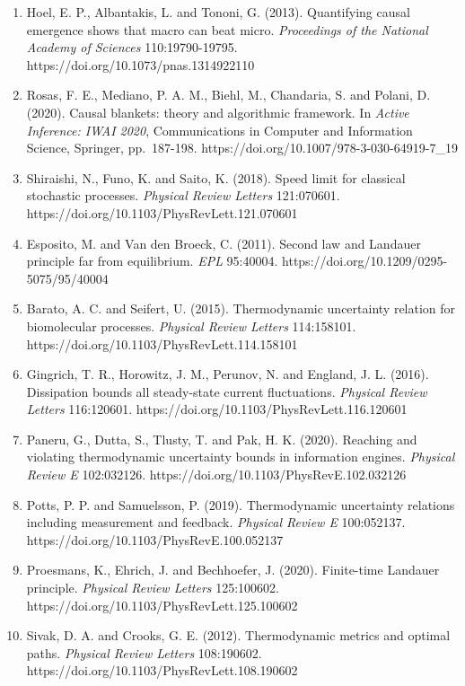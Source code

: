 \documentclass[
  10pt,
]{article}
\begin{document}
\begin{enumerate}
{  Biosciences} 139:209-223. https://doi.org/10.1007/s12064-020-00313-7
\item
  Hoel, E. P., Albantakis, L. and Tononi, G. (2013). Quantifying causal
  emergence shows that macro can beat micro. \emph{Proceedings of the
  National Academy of Sciences} 110:19790-19795.
  https://doi.org/10.1073/pnas.1314922110
\item
  Rosas, F. E., Mediano, P. A. M., Biehl, M., Chandaria, S. and Polani,
  D. (2020). Causal blankets: theory and algorithmic framework. In
  \emph{Active Inference: IWAI 2020}, Communications in Computer and
  Information Science, Springer, pp.~187-198.
  https://doi.org/10.1007/978-3-030-64919-7\_19
\item
  Shiraishi, N., Funo, K. and Saito, K. (2018). Speed limit for
  classical stochastic processes. \emph{Physical Review Letters}
  121:070601. https://doi.org/10.1103/PhysRevLett.121.070601
\item
  Esposito, M. and Van den Broeck, C. (2011). Second law and Landauer
  principle far from equilibrium. \emph{EPL} 95:40004.
  https://doi.org/10.1209/0295-5075/95/40004
\item
  Barato, A. C. and Seifert, U. (2015). Thermodynamic uncertainty
  relation for biomolecular processes. \emph{Physical Review Letters}
  114:158101. https://doi.org/10.1103/PhysRevLett.114.158101
\item
  Gingrich, T. R., Horowitz, J. M., Perunov, N. and England, J. L.
  (2016). Dissipation bounds all steady-state current fluctuations.
  \emph{Physical Review Letters} 116:120601.
  https://doi.org/10.1103/PhysRevLett.116.120601
\item
  Paneru, G., Dutta, S., Tlusty, T. and Pak, H. K. (2020). Reaching and
  violating thermodynamic uncertainty bounds in information engines.
  \emph{Physical Review E} 102:032126.
  https://doi.org/10.1103/PhysRevE.102.032126
\item
  Potts, P. P. and Samuelsson, P. (2019). Thermodynamic uncertainty
  relations including measurement and feedback. \emph{Physical Review E}
  100:052137. https://doi.org/10.1103/PhysRevE.100.052137
\item
  Proesmans, K., Ehrich, J. and Bechhoefer, J. (2020). Finite-time
  Landauer principle. \emph{Physical Review Letters} 125:100602.
  https://doi.org/10.1103/PhysRevLett.125.100602
\item
  Sivak, D. A. and Crooks, G. E. (2012). Thermodynamic metrics and
  optimal paths. \emph{Physical Review Letters} 108:190602.
  https://doi.org/10.1103/PhysRevLett.108.190602

\end{enumerate}
\end{document}

